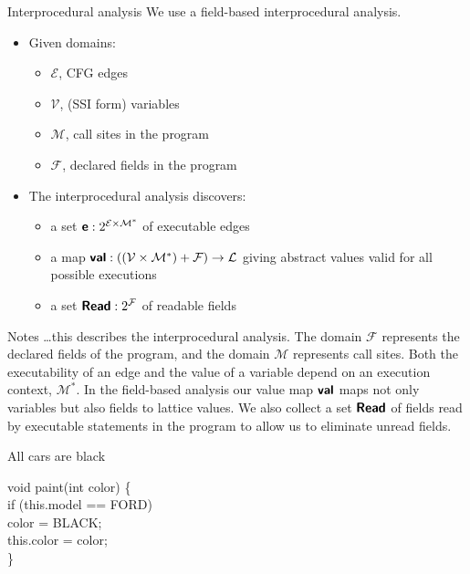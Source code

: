\documentclass[%
pdf,
colorBG,
slideColor,
nototal,
oqe
]{prosper}
\renewcommand{\yellow}{\colC}
\newcommand{\func}[1]{\ensuremath{\text{\sffamily\bfseries #1}}}
\newenvironment{talknotes}{\begin{slide}{Notes}\tiny}{\end{slide}}
\begin{document}
\begin{slide}{Interprocedural analysis}
We use a {\yellow field-based} interprocedural analysis.
\begin{itemize}
\item Given domains:
\begin{itemize}
\item $\mathcal{E}$, CFG edges
\item $\mathcal{V}$, (SSI form) variables
\item $\mathcal{M}$, call sites in the program
\item $\mathcal{F}$, declared fields in the program
\end{itemize}
\item The interprocedural analysis discovers:
\begin{itemize}
\item a set $\func{e}:2^{\mathcal{E}\times\mathcal{M}^*}$ of executable edges
\item a map $\func{val}:\left(\left(\mathcal{V}\times\mathcal{M}^*\right)+\mathcal{F}\right)\to\mathcal{L}$
 giving abstract values valid for all possible executions
\item a set $\func{Read}:2^\mathcal{F}$ of readable fields
\end{itemize}
\end{itemize}
\end{slide}
\begin{talknotes}
\ldots this describes the interprocedural analysis.
The domain $\mathcal{F}$ represents the declared fields of the
program, and the domain $\mathcal{M}$ represents call sites.
Both the executability of an edge and the value of a variable depend
on an execution context, $\mathcal{M}^*$.  In the field-based analysis
our value map $\func{val}$ maps not
only variables but also fields to lattice values.  We also collect a
set $\func{Read}$ of fields read by executable statements in the
program to allow us to eliminate unread fields.
\end{talknotes}

\begin{slide}{All cars are black}
\vspace{1cm}
\begin{samplecode}
void paint(int color) \{\\
\>if (this.model == FORD)\\
\>\>color = BLACK;\\
\>this.color = color;\\
\}\\
\end{samplecode}
\end{slide}
\end{document}
